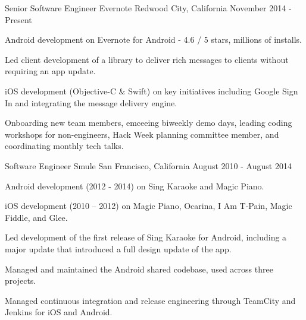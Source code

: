 

\begin{cventries}

  \cventry
    {Senior Software Engineer} %
    {Evernote} %
    {Redwood City, California} %
    {November 2014 - Present} %
    {
      \begin{cvitems} %
        \item {Android development on Evernote for Android - 4.6 / 5 stars, millions of installs.}
        \item {Led client development of a library to deliver rich messages to clients without requiring an app update.}
        \item {iOS development (Objective-C \& Swift) on key initiatives including Google Sign In and integrating the message delivery engine.}
		\item {Onboarding new team members, emceeing biweekly demo days, leading coding workshops for non-engineers, Hack Week planning committee member, and coordinating monthly tech talks.}
      \end{cvitems}
    }
    
  \cventry
    {Software Engineer} %
    {Smule} %
    {San Francisco, California} %
    {August 2010 - August 2014} %
    {
      \begin{cvitems} %
        \item {Android development (2012 - 2014) on Sing Karaoke and Magic Piano.}
        \item {iOS development (2010 – 2012) on Magic Piano, Ocarina, I Am T-Pain, Magic Fiddle, and Glee.}
        \item {Led development of the first release of Sing Karaoke for Android, including a major update that introduced a full design update of the app.}
        \item {Managed and maintained the Android shared codebase, used across three projects.}
        \item {Managed continuous integration and release engineering through TeamCity and Jenkins for iOS and Android.}
      \end{cvitems}
    }
    

\end{cventries}
